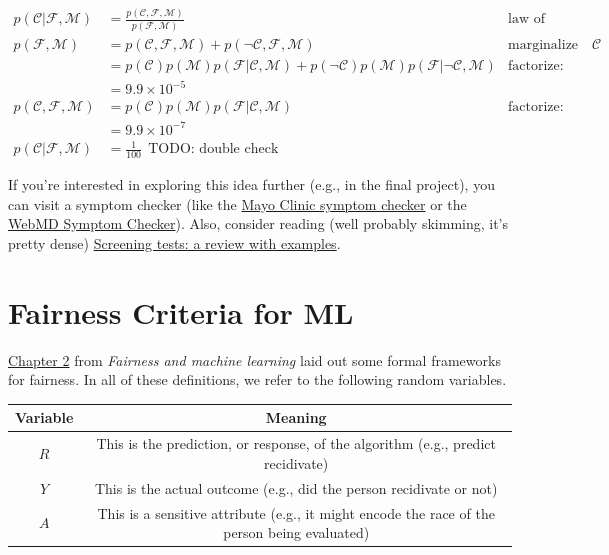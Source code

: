 \documentclass{tufte-handout}
\begin{document}
\begin{exercise}
\begin{boxedsolution}
\begin{align}
p(\mathcal{C}|\mathcal{F}, \mathcal{M}) &= \frac{p(\mathcal{C}, \mathcal{F}, \mathcal{M})}{p(\mathcal{F}, \mathcal{M})}& \mbox{law of conditional probability} \nonumber \\
p(\mathcal{F}, \mathcal{M}) &= p(\mathcal{C}, \mathcal{F}, \mathcal{M}) + p(\neg \mathcal{C}, \mathcal{F}, \mathcal{M})&\mbox{marginalize over $\mathcal{C}$} \nonumber \\
&= p(\mathcal{C}) p(\mathcal{M}) p(\mathcal{F}|\mathcal{C}, \mathcal{M}) + p(\neg \mathcal{C}) p(\mathcal{M}) p(\mathcal{F}|\neg\mathcal{C}, \mathcal{M}) & \mbox{factorize: children given parents}\nonumber \\
&= 9.9 \times 10^{-5} \nonumber \\
 p(\mathcal{C}, \mathcal{F}, \mathcal{M}) &= p(\mathcal{C}) p(\mathcal{M}) p(\mathcal{F}|\mathcal{C}, \mathcal{M})  & \mbox{factorize: children given parents}\nonumber \\
 &= 9.9 \times 10^{-7} \nonumber \\
 p(\mathcal{C}|\mathcal{F}, \mathcal{M}) &= \frac{1}{100}~~\mbox{TODO: double check} \nonumber
\end{align}
\end{boxedsolution}
\ees

\noindent If you're interested in exploring this idea further (e.g., in the final project), you can visit a symptom checker (like the \href{https://www.mayoclinic.org/symptom-checker/select-symptom/itt-20009075}{Mayo Clinic symptom checker} or the \href{https://symptoms.webmd.com/default.htm\#/info}{WebMD Symptom Checker}).  Also, consider reading (well probably skimming, it's pretty dense) \href{https://www.ncbi.nlm.nih.gov/pmc/articles/PMC4389712/}{Screening tests: a review with examples}.

\end{exercise}

\section{Fairness Criteria for ML}

\href{https://fairmlbook.org/classification.html}{Chapter 2} from \emph{Fairness and machine learning} laid out some formal frameworks for fairness.  In all of these definitions, we refer to the following random variables.

\vspace{1em}
\begin{tabular}{c | c}
\textbf{Variable} & \textbf{Meaning} \\
\hline
$R$ & This is the prediction, or response, of the algorithm (e.g., predict recidivate) \\
$Y$ & This is the actual outcome (e.g., did the person recidivate or not) \\
$A$ & This is a sensitive attribute (e.g., it might encode the race of the person being evaluated)
\end{tabular}
\end{document}
